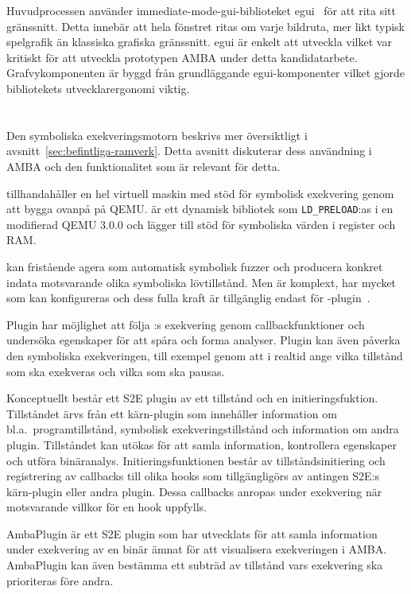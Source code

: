 Huvudprocessen använder immediate-mode-gui-biblioteket egui~\cite{egui} för att
rita sitt gränssnitt. Detta innebär att hela fönstret ritas om varje bildruta,
mer likt typisk spelgrafik än klassiska grafiska gränssnitt. egui är enkelt att
utveckla vilket var kritiskt för att utveckla prototypen AMBA under detta
kandidatarbete. Grafvykomponenten är byggd från grundläggande egui-komponenter
vilket gjorde bibliotekets utvecklarergonomi viktig.

\section{\stoe{}}\label{sec:s2e}

Den symboliska exekveringsmotorn \stoe{} beskrivs mer översiktligt i
avsnitt~\ref{sec:befintliga-ramverk}. Detta avsnitt diskuterar dess användning
i AMBA och den funktionalitet som är relevant för detta.\@

\stoe{} tillhandahåller en hel virtuell maskin med stöd för symbolisk exekvering
genom att bygga ovanpå på QEMU.\@ \stoe{} är ett dynamisk bibliotek som
\verb|LD_PRELOAD|:as i en modifierad QEMU 3.0.0 och lägger till stöd för
symboliska värden i register och RAM.\@

\stoe{} kan fristående agera som automatisk symbolisk fuzzer och producera
konkret indata motsvarande olika symboliska lövtillstånd. Men \stoe{} är
komplext, har mycket som kan konfigureras och dess fulla kraft är tillgänglig
endast för \stoe{}-plugin~\cite{Chipounov12}.

Plugin har möjlighet att följa \stoe{}:s exekvering genom callbackfunktioner och
undersöka egenskaper för att spåra och forma analyser. Plugin kan även påverka
den symboliska exekveringen, till exempel genom att i realtid ange vilka
tillstånd som ska exekveras och vilka som ska pausas.

Konceptuellt består ett S2E plugin av ett tillstånd och en initieringsfuktion.
Tillståndet ärvs från ett kärn-plugin som innehåller information om bl.a.\
programtillstånd, symbolisk exekveringstillstånd och information om andra
plugin. Tillståndet kan utökas för att samla information, kontrollera egenskaper
och utföra binäranalys. Initieringsfunktionen består av tillståndsinitiering och
registrering av callbacks till olika hooks som tillgängligörs av antingen S2E:s
kärn-plugin eller andra plugin. Dessa callbacks anropas under exekvering när
motsvarande villkor för en hook uppfylls.

AmbaPlugin är ett S2E plugin som har utvecklats för att samla information under
exekvering av en binär ämnat för att visualisera exekveringen i AMBA.\@
AmbaPlugin kan även bestämma ett subträd av tillstånd vars exekvering ska
prioriteras före andra.

